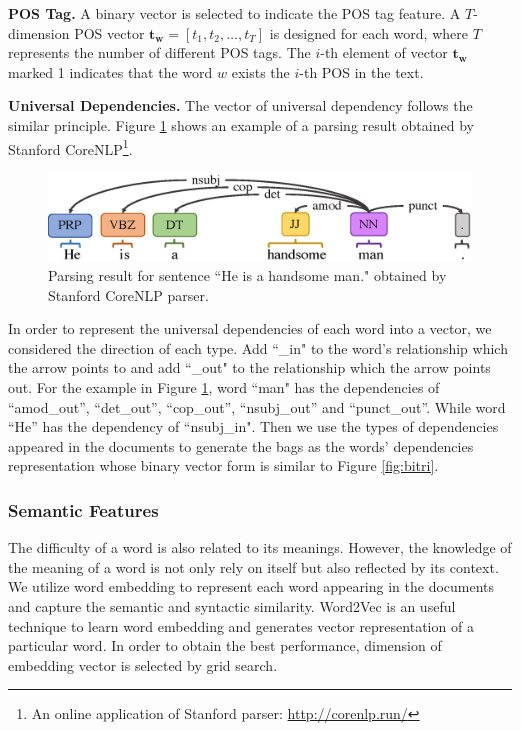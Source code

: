 \textbf{POS Tag.} A binary vector is selected to indicate the POS tag feature.
A $T$-dimension POS vector $\mathbf{t_w}=[t_1, t_2,\dots, t_T]$ is designed for each word, where $T$ represents the number of different POS tags. The $i$-th element of vector $\mathbf{t_w}$ marked 1 indicates that the word $w$ exists the $i$-th POS in the text.

\textbf{Universal Dependencies.}
	The vector of universal dependency follows the similar principle.
Figure \ref{fig:parser} shows an example of a parsing result obtained by Stanford CoreNLP\footnote{An online application of Stanford parser: \url{http://corenlp.run/}}.
\begin{figure}[th]
	\centering
	\includegraphics[width=1\linewidth]{pic/parsing.eps} 
	\caption{Parsing result for sentence ``He is a handsome man." obtained by Stanford CoreNLP parser.}
	\label{fig:parser}
\end{figure}

In order to represent the universal dependencies of each word into a vector, we considered the direction of each type.
Add ``\_in" to the word's relationship which the arrow points to and add ``\_out" to the relationship which the arrow points out.
For the example in Figure \ref{fig:parser}, 
word ``man" has the dependencies of ``amod\_out'', ``det\_out'', ``cop\_out'', ``nsubj\_out'' and ``punct\_out''.
While word ``He'' has the dependency of ``nsubj\_in".
Then we use the types of dependencies appeared in the documents to generate the bags as the words' dependencies representation whose binary vector form is similar to Figure \ref{fig:bitri}.

\subsubsection{Semantic Features}
The difficulty of a word is also related to its meanings.
However, the knowledge of the meaning of a word is not only rely on itself but also reflected by its context. 
We utilize word embedding to represent each word appearing in the documents and capture the semantic and syntactic similarity.
Word2Vec is an useful technique to learn word embedding and generates vector representation of a particular word. In order to obtain the best performance, dimension of embedding vector is selected by grid search.

